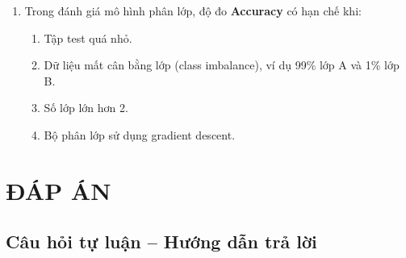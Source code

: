 \documentclass[10pt]{article}
\begin{document}
\begin{enumerate}[leftmargin=*, label=\textbf{Câu \arabic*.}]
    \item Trong đánh giá mô hình phân lớp, độ đo \textbf{Accuracy} có hạn chế khi:
    \begin{enumerate}[label=\Alph*.]
        \item Tập test quá nhỏ.
        \item Dữ liệu mất cân bằng lớp (class imbalance), ví dụ 99\% lớp A và 1\% lớp B.
        \item Số lớp lớn hơn 2.
        \item Bộ phân lớp sử dụng gradient descent.
    \end{enumerate}

\end{enumerate}

\newpage
\section*{ĐÁP ÁN}

\subsection*{Câu hỏi tự luận -- Hướng dẫn trả lời}
\end{document}
